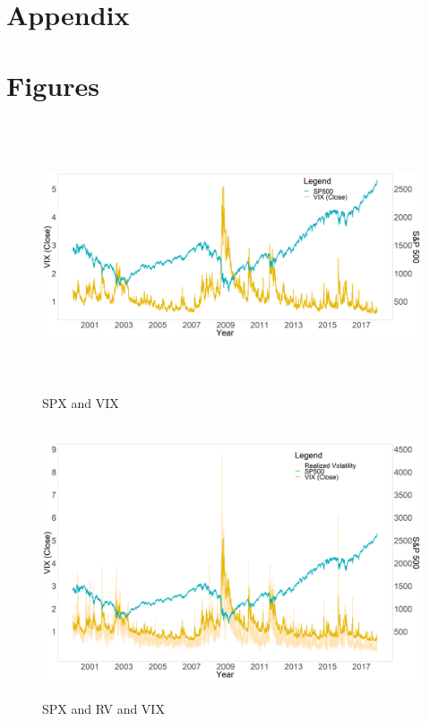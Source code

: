 \section*{Appendix}
\appendix
\section*{Figures}
%
\begin{figure}[!htbp]\caption{\ac{SPX} and VIX}\label{fig:SPandVIX}
\centering
\includegraphics[width=18cm, height=8cm]{pictures/SPandViX.png}
\end{figure}
%
\begin{figure}[!htbp]\caption{\ac{SPX} and RV and VIX}\label{fig:SPandVIXandVol}
\centering
\includegraphics[width=18cm, height=8cm]{pictures/SPandVolandViX.png}
\end{figure}
\restoregeometry

\newpage

